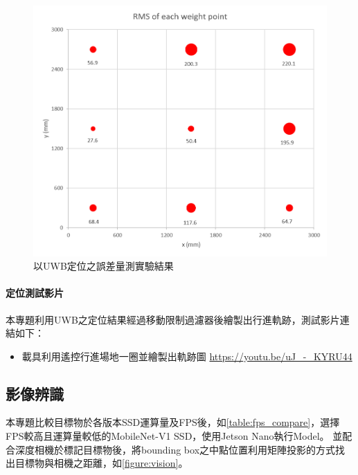 \begin{figure}[bht]
	\centering
	\includegraphics[height=!,width=\linewidth,keepaspectratio=true]
	{images/uwb_bench.png}
	\caption{以UWB定位之誤差量測實驗結果}
	\label{figure:localization_result}
\end{figure}

\paragraph{定位測試影片} 

本專題利用UWB之定位結果經過移動限制過濾器後繪製出行進軌跡，測試影片連結如下：

\begin{itemize}

\item
載具利用遙控行進場地一圈並繪製出軌跡圖
\url{https://youtu.be/uJ_-_KYRU44}

\end{itemize}


\subsection{影像辨識}

本專題比較目標物於各版本SSD運算量及FPS後，如\ref{table:fps_compare}，選擇FPS較高且運算量較低的MobileNet-V1 SSD，使用Jetson Nano執行Model。
並配合深度相機於標記目標物後，將bounding box之中點位置利用矩陣投影的方式找出目標物與相機之距離，如\ref{figure:vision}。

